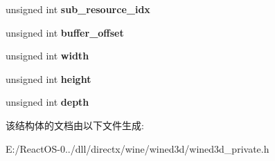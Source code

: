\begin{DoxyCompactItemize}
unsigned int {\bfseries sub\+\_\+resource\+\_\+idx}
\item 
\mbox{\label{structwined3d__rendertarget__view_a9f6956ad16dd0439cf0d293dfe0bfe4d}} 
unsigned int {\bfseries buffer\+\_\+offset}
\item 
\mbox{\label{structwined3d__rendertarget__view_a9dab319d870f122ea9800071593ed264}} 
unsigned int {\bfseries width}
\item 
\mbox{\label{structwined3d__rendertarget__view_a529c8b060594800d862e9b0cd7da95a5}} 
unsigned int {\bfseries height}
\item 
\mbox{\label{structwined3d__rendertarget__view_a9e5ec0cc20f6b6b18188dc6cc207cc9a}} 
unsigned int {\bfseries depth}
\end{DoxyCompactItemize}


该结构体的文档由以下文件生成\+:\begin{DoxyCompactItemize}
\item 
E\+:/\+React\+O\+S-\/0../dll/directx/wine/wined3d/wined3d\+\_\+private.\+h\end{DoxyCompactItemize}
